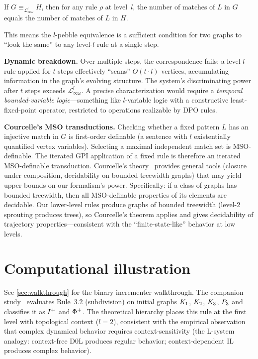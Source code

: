 \documentclass{../shared/primo}
\begin{document}
\begin{proposition}\label{prop:pebble}
If $G \equiv_{\mathcal{L}^l_{\infty\omega}} H$, then for any rule $\rho$ at level~$l$, the number of matches of $L$ in $G$ equals the number of matches of $L$ in $H$.
\end{proposition}

This means the $l$-pebble equivalence is a sufficient condition for two graphs to ``look the same'' to any level-$l$ rule at a single step.

\textbf{Dynamic breakdown.} Over multiple steps, the correspondence fails: a level-$l$ rule applied for $t$ steps effectively ``scans'' $O(t \cdot l)$ vertices, accumulating information in the graph's evolving structure. The system's discriminating power after $t$ steps exceeds $\mathcal{L}^l_{\infty\omega}$. A precise characterization would require a \emph{temporal bounded-variable logic}---something like $l$-variable logic with a constructive least-fixed-point operator, restricted to operations realizable by DPO rules.

\textbf{Courcelle's MSO transductions.} Checking whether a fixed pattern $L$ has an injective match in $G$ is first-order definable (a sentence with $l$ existentially quantified vertex variables). Selecting a maximal independent match set is MSO-definable. The iterated GPI application of a fixed rule is therefore an iterated MSO-definable transduction. Courcelle's theory~\cite{courcelle1994monadic,courcelle2012graph} provides general tools (closure under composition, decidability on bounded-treewidth graphs) that may yield upper bounds on our formalism's power. Specifically: if a class of graphs has bounded treewidth, then all MSO-definable properties of its elements are decidable. Our lower-level rules produce graphs of bounded treewidth (level-2 sprouting produces trees), so Courcelle's theorem applies and gives decidability of trajectory properties---consistent with the ``finite-state-like'' behavior at low levels.


\section{Computational illustration}
\label{sec:illustration}

See \cref{sec:walkthrough} for the binary incrementer walkthrough. The companion study~\cite{kowalczyk2026predicates} evaluates Rule~3.2 (subdivision) on initial graphs $K_{1}$, $K_{2}$, $K_{3}$, $P_{3}$ and classifies it as $I\textsuperscript{+}$ and $\Phi\textsuperscript{+}$. The theoretical hierarchy places this rule at the first level with topological context ($l = 2$), consistent with the empirical observation that complex dynamical behavior requires context-sensitivity (the L-system analogy: context-free D0L produces regular behavior; context-dependent IL produces complex behavior).
\end{document}
